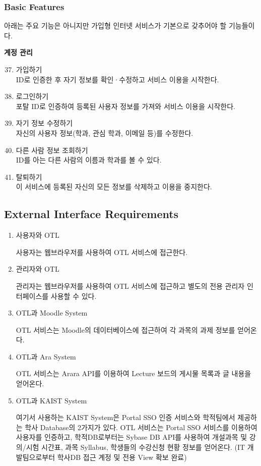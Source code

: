 \documentclass[a4paper,titlepage]{article}
\begin{document}
\subsubsection{Basic Features}
아래는 주요 기능은 아니지만 가입형 인터넷 서비스가 기본으로 갖추어야 할 기능들이다.
\begin{funcreq}
	\setcounter{enumi}{6}
	\item\textbf{계정 관리}
	\begin{enumerate}
		\setcounter{enumii}{36}
		\item 가입하기\\
		ID로 인증한 후 자기 정보를 확인·수정하고 서비스 이용을 시작한다. 
		\item 로그인하기\\
		포탈 ID로 인증하여 등록된 사용자 정보를 가져와 서비스 이용을 시작한다. 
		\item 자기 정보 수정하기\\
		자신의 사용자 정보(학과, 관심 학과, 이메일 등)를 수정한다. 
		\item 다른 사람 정보 조회하기\\
		ID를 아는 다른 사람의 이름과 학과를 볼 수 있다. 
		\item 탈퇴하기\\
		이 서비스에 등록된 자신의 모든 정보를 삭제하고 이용을 중지한다. 
	\end{enumerate}
\end{funcreq}

\subsection{External Interface Requirements}
\begin{enumerate}
	\item 사용자와 OTL

	사용자는 웹브라우저를 사용하여 OTL 서비스에 접근한다.

	\item 관리자와 OTL

	관리자는 웹브라우저를 사용하여 OTL 서비스에 접근하고 별도의 전용 관리자 인터페이스를 사용할 수 있다.

	\item OTL과 Moodle System

	OTL 서비스는 Moodle의 데이터베이스에 접근하여 각 과목의 과제 정보를 얻어온다.

	\item OTL과 Ara System

	OTL 서비스는 Arara API를 이용하여 Lecture 보드의 게시물 목록과 글 내용을 얻어온다.

	\item OTL과 KAIST System

	여기서 사용하는 KAIST System은 Portal SSO 인증 서비스와 학적팀에서 제공하는 학사 Database의 2가지가 있다.
	OTL 서비스는 Portal SSO 서비스를 이용하여 사용자를 인증하고, 학적DB로부터는 Sybase DB API를 사용하여 개설과목 및 강의/시험 시간표, 과목 Syllabus, 학생들의 수강신청 현황 정보를 얻어온다.
	(IT 개발팀으로부터 학사DB 접근 계정 및 전용 View 확보 완료)

\end{enumerate}
\end{document}
